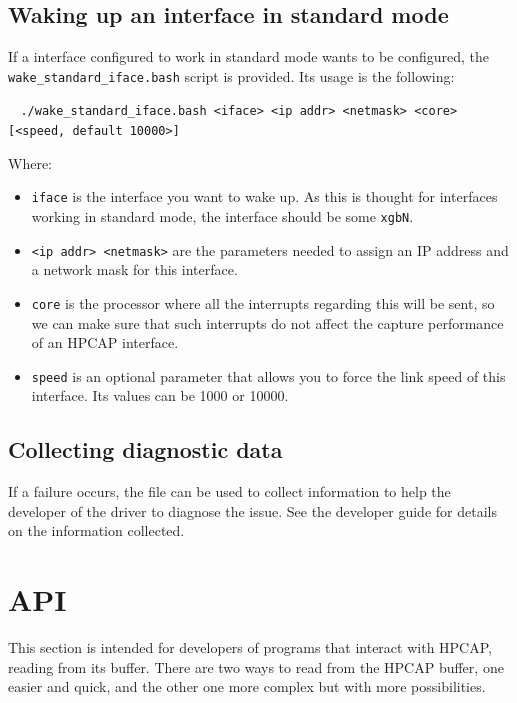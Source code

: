 \documentclass[a4paper,oneside]{hpman}
\begin{document}
\section{Waking up an interface in standard mode}
\label{subs:standard}

If a interface configured to work in standard mode wants to be configured, the \texttt{wake\_standard\_iface.bash} script is provided. Its usage is the following:

$\;\;$ \texttt{./wake\_standard\_iface.bash <iface> <ip addr> <netmask> <core> [<speed, default 10000>]}

Where:
\begin{itemize}
    \item \texttt{iface} is the interface you want to wake up. As this is thought for interfaces working in standard mode, the interface should be some \texttt{xgbN}.

    \item \texttt{<ip addr> <netmask>} are the parameters needed to assign an IP address and a network mask for this interface.

    \item \texttt{core} is the processor where all the interrupts regarding this will be sent, so we can make sure that such interrupts do not affect the capture performance of an HPCAP interface.
    \item \texttt{speed} is an optional parameter that allows you to force the link speed of this interface. Its values can be 1000 or 10000.

\end{itemize}

\section{Collecting diagnostic data}
\label{sec:DiagnosticData}

If a failure occurs, the file  can be used to collect information to help the developer of the driver to diagnose the issue. See the developer guide for details on the information collected.

\chapter{API}

This section is intended for developers of programs that interact with HPCAP, reading from its buffer. There are two ways to read from the HPCAP buffer, one easier and quick, and the other one more complex but with more possibilities.
\end{document}
